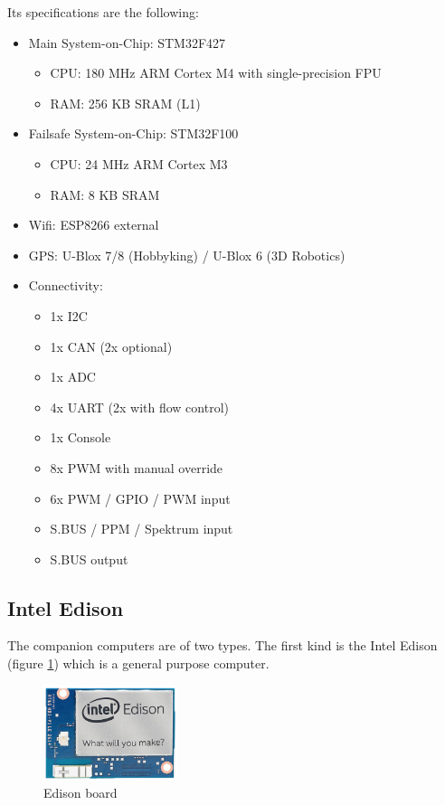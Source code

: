 Its specifications are the following:
\begin{itemize}
  \item Main System-on-Chip: STM32F427
        \begin{itemize}
          \item CPU: 180 MHz ARM Cortex M4 with single-precision FPU
          \item RAM: 256 KB SRAM (L1)
        \end{itemize}

  \item Failsafe System-on-Chip: STM32F100
        \begin{itemize}
          \item CPU: 24 MHz ARM Cortex M3
          \item RAM: 8 KB SRAM
        \end{itemize}

  \item Wifi: ESP8266 external
  \item GPS: U-Blox 7/8 (Hobbyking) / U-Blox 6 (3D Robotics)
  \item Connectivity:
    \begin{itemize}
      \item 1x I2C
      \item 1x CAN (2x optional)
      \item 1x ADC
      \item 4x UART (2x with flow control)
      \item 1x Console
      \item 8x PWM with manual override
      \item 6x PWM / GPIO / PWM input
      \item S.BUS / PPM / Spektrum input
      \item S.BUS output
    \end{itemize}
\end{itemize}

\subsection{Intel Edison}
The companion computers are of two types.
The first kind is the Intel Edison \cite{edison} (figure \ref{fig:hardware_edison})
which is a general purpose computer.

\begin{figure}[h]
\centering
\includegraphics[width=0.35\textwidth]{chapters/chapter-03/figures/hardware_edison.png}
\caption{Edison board}
\label{fig:hardware_edison}
\end{figure}

